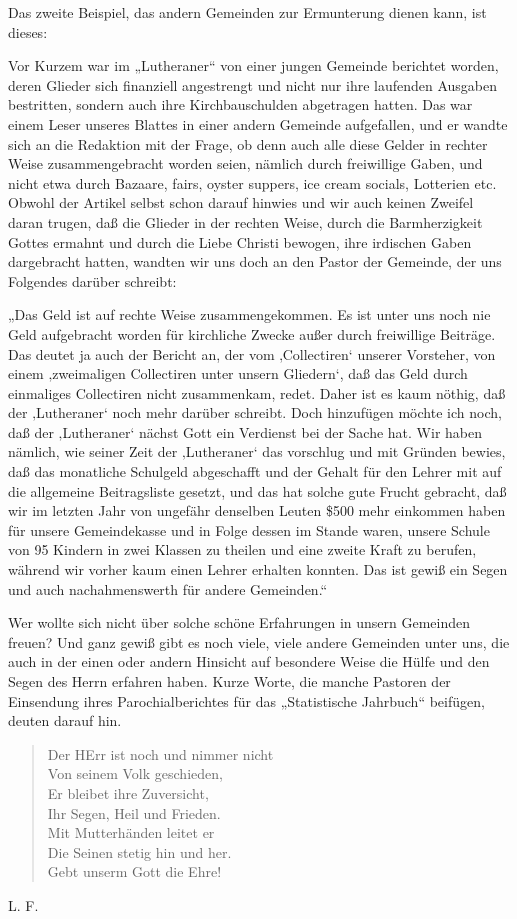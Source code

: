 Das zweite Beispiel, das andern Gemeinden zur Ermunterung dienen kann, ist dieses:

Vor Kurzem war im „Lutheraner“ von einer jungen Gemeinde berichtet worden, deren Glieder sich finanziell angestrengt und nicht nur ihre laufenden Ausgaben bestritten, sondern auch ihre Kirchbauschulden abgetragen hatten. Das war einem Leser unseres Blattes in einer andern Gemeinde aufgefallen, und er wandte sich an die Redaktion mit der Frage, ob denn auch alle diese Gelder in rechter Weise zusammengebracht worden seien, nämlich durch freiwillige Gaben, und nicht etwa durch Bazaare, fairs, oyster suppers, ice cream socials, Lotterien etc. Obwohl der Artikel selbst schon darauf hinwies und wir auch keinen Zweifel daran trugen, daß die Glieder in der rechten Weise, durch die Barmherzigkeit Gottes ermahnt und durch die Liebe Christi bewogen, ihre irdischen Gaben dargebracht hatten, wandten wir uns doch an den Pastor der Gemeinde, der uns Folgendes darüber schreibt:

„Das Geld ist auf rechte Weise zusammengekommen. Es ist unter uns noch nie Geld aufgebracht worden für kirchliche Zwecke außer durch freiwillige Beiträge. Das deutet ja auch der Bericht an, der vom ‚Collectiren‘ unserer Vorsteher, von einem ‚zweimaligen Collectiren unter unsern Gliedern‘, daß das Geld durch einmaliges Collectiren nicht zusammenkam, redet. Daher ist es kaum nöthig, daß der ‚Lutheraner‘ noch mehr darüber schreibt. Doch hinzufügen möchte ich noch, daß der ‚Lutheraner‘ nächst Gott ein Verdienst bei der Sache hat. Wir haben nämlich, wie seiner Zeit der ‚Lutheraner‘ das vorschlug und mit Gründen bewies, daß das monatliche Schulgeld abgeschafft und der Gehalt für den Lehrer mit auf die allgemeine Beitragsliste gesetzt, und das hat solche gute Frucht gebracht, daß wir im letzten Jahr von ungefähr denselben Leuten \$500 mehr einkommen haben für unsere Gemeindekasse und in Folge dessen im Stande waren, unsere Schule von 95 Kindern in zwei Klassen zu theilen und eine zweite Kraft zu berufen, während wir vorher kaum einen Lehrer erhalten konnten. Das ist gewiß ein Segen und auch nachahmenswerth für andere Gemeinden.“

Wer wollte sich nicht über solche schöne Erfahrungen in unsern Gemeinden freuen? Und ganz gewiß gibt es noch viele, viele andere Gemeinden unter uns, die auch in der einen oder andern Hinsicht auf besondere Weise die Hülfe und den Segen des Herrn erfahren haben. Kurze Worte, die manche Pastoren der Einsendung ihres Parochialberichtes für das „Statistische Jahrbuch“ beifügen, deuten darauf hin.

\begin{verse}
Der HErr ist noch und nimmer nicht\\
Von seinem Volk geschieden,\\
Er bleibet ihre Zuversicht,\\
Ihr Segen, Heil und Frieden.\\
Mit Mutterhänden leitet er\\
Die Seinen stetig hin und her.\\
Gebt unserm Gott die Ehre!
\end{verse}

L. F.
